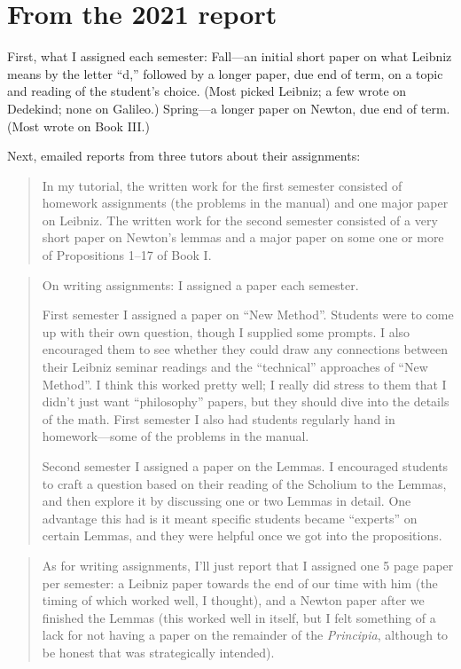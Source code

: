 \documentclass{article}
\begin{document}
\section{From the 2021 report}

First, what I assigned each semester: Fall---an initial short paper on what Leibniz means by the letter ``d,'' followed by a longer paper, due end of term, on a topic and reading of the student's choice. (Most picked Leibniz; a few wrote on Dedekind; none  on Galileo.) Spring---a longer paper on Newton, due end of term. (Most wrote on Book III.) 

Next, emailed reports from three tutors about their assignments:
\begin{quotation}{\small In my tutorial, the written work for the first semester consisted of homework assignments (the problems in the manual) and one major paper on Leibniz. The written work for the second semester consisted of a very short paper on Newton's lemmas and a major paper on some one or more of Propositions 1--17 of Book I.}  
\end{quotation}

	\begin{quotation}
		{\small On writing assignments: I assigned a paper each semester. 

First semester I assigned a paper on ``New Method''. Students were to come up with their own question, though I supplied some prompts. I also encouraged them to see whether they could draw any connections between their Leibniz seminar readings and the ``technical'' approaches of ``New Method''. I think this worked pretty well; I really did stress to them that I didn't just want ``philosophy'' papers, but they should dive into the details of the math. First semester I also had students regularly hand in homework---some of the problems in the manual. 

Second semester I assigned a paper on the Lemmas. I encouraged students to craft a question based on their reading of the Scholium to the Lemmas, and then explore it by discussing one or two Lemmas in detail. One advantage this had is it meant specific students became ``experts'' on certain Lemmas, and they were helpful once we got into the propositions.}
\end{quotation}
	\begin{quotation} {\small As for writing assignments, I'll just report that I assigned one 5 page paper per semester: a Leibniz paper towards the end of our time with him (the timing of which worked well, I thought), and a Newton paper after we finished the Lemmas (this worked well in itself, but I felt something of a lack for not having a paper on the remainder of the \emph{Principia}, although to be honest that was strategically intended).} \end{quotation}
\end{document}
